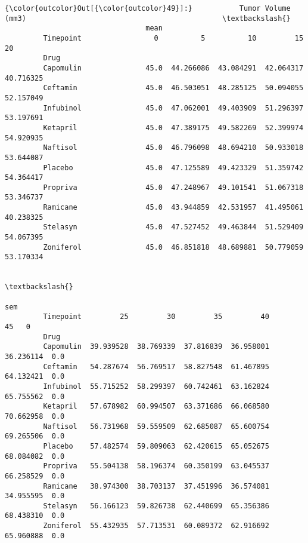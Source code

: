 \documentclass[11pt]{article}
\begin{document}
\begin{Verbatim}[commandchars=\\\{\}]
{\color{outcolor}Out[{\color{outcolor}49}]:}           Tumor Volume (mm3)                                              \textbackslash{}
                                 mean                                               
         Timepoint                 0          5          10         15         20   
         Drug                                                                       
         Capomulin               45.0  44.266086  43.084291  42.064317  40.716325   
         Ceftamin                45.0  46.503051  48.285125  50.094055  52.157049   
         Infubinol               45.0  47.062001  49.403909  51.296397  53.197691   
         Ketapril                45.0  47.389175  49.582269  52.399974  54.920935   
         Naftisol                45.0  46.796098  48.694210  50.933018  53.644087   
         Placebo                 45.0  47.125589  49.423329  51.359742  54.364417   
         Propriva                45.0  47.248967  49.101541  51.067318  53.346737   
         Ramicane                45.0  43.944859  42.531957  41.495061  40.238325   
         Stelasyn                45.0  47.527452  49.463844  51.529409  54.067395   
         Zoniferol               45.0  46.851818  48.689881  50.779059  53.170334   
         
                                                                                \textbackslash{}
                                                                           sem   
         Timepoint         25         30         35         40         45   0    
         Drug                                                                    
         Capomulin  39.939528  38.769339  37.816839  36.958001  36.236114  0.0   
         Ceftamin   54.287674  56.769517  58.827548  61.467895  64.132421  0.0   
         Infubinol  55.715252  58.299397  60.742461  63.162824  65.755562  0.0   
         Ketapril   57.678982  60.994507  63.371686  66.068580  70.662958  0.0   
         Naftisol   56.731968  59.559509  62.685087  65.600754  69.265506  0.0   
         Placebo    57.482574  59.809063  62.420615  65.052675  68.084082  0.0   
         Propriva   55.504138  58.196374  60.350199  63.045537  66.258529  0.0   
         Ramicane   38.974300  38.703137  37.451996  36.574081  34.955595  0.0   
         Stelasyn   56.166123  59.826738  62.440699  65.356386  68.438310  0.0   
         Zoniferol  55.432935  57.713531  60.089372  62.916692  65.960888  0.0   
         

\end{Verbatim}
\end{document}
